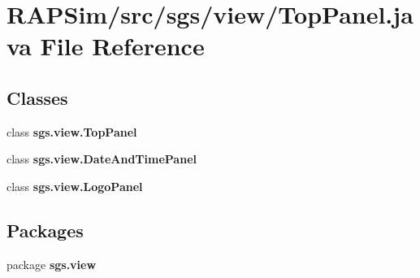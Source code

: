\section{R\-A\-P\-Sim/src/sgs/view/\-Top\-Panel.java File Reference}
\label{_top_panel_8java}
\subsection*{Classes}
\begin{DoxyCompactItemize}
\item 
class {\bf sgs.\-view.\-Top\-Panel}
\item 
class {\bfseries sgs.\-view.\-Date\-And\-Time\-Panel}
\item 
class {\bfseries sgs.\-view.\-Logo\-Panel}
\end{DoxyCompactItemize}
\subsection*{Packages}
\begin{DoxyCompactItemize}
\item 
package {\bf sgs.\-view}
\end{DoxyCompactItemize}

